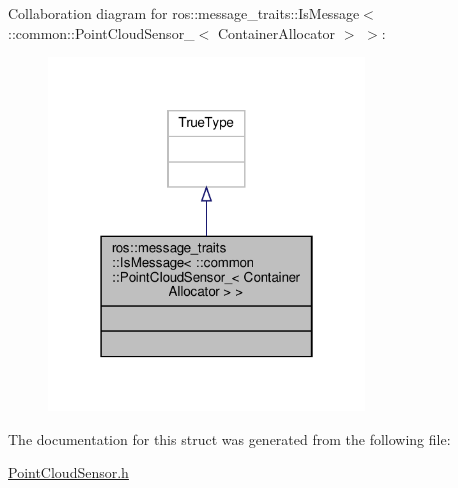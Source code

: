 Collaboration diagram for ros\+:\+:message\+\_\+traits\+:\+:Is\+Message$<$ \+:\+:common\+:\+:Point\+Cloud\+Sensor\+\_\+$<$ Container\+Allocator $>$ $>$\+:\nopagebreak
\begin{figure}[H]
\begin{center}
\leavevmode
\includegraphics[width=238pt]{d6/db6/structros_1_1message__traits_1_1IsMessage_3_01_1_1common_1_1PointCloudSensor___3_01ContainerAllocator_01_4_01_4__coll__graph}
\end{center}
\end{figure}


The documentation for this struct was generated from the following file\+:\begin{DoxyCompactItemize}
\item 
\hyperlink{PointCloudSensor_8h}{Point\+Cloud\+Sensor.\+h}\end{DoxyCompactItemize}
